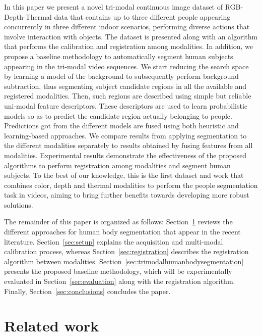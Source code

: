 \documentclass[10pt,twocolumn,letterpaper]{article}
\begin{document}
In this paper we present a novel tri-modal continuous image dataset of RGB-Depth-Thermal data that contains up to three different people appearing concurrently in three different indoor scenarios, performing diverse actions that involve interaction with objects. The dataset is presented along with an algorithm that performs the calibration and registration among modalities. In addition, we propose a baseline methodology to automatically segment human subjects appearing in the tri-modal video sequences. We start reducing the search space by learning a model of the background to subsequently perform background subtraction, thus segmenting subject candidate regions in all the available and registered modalities. Then, such regions are described using simple but reliable uni-modal feature descriptors. These descriptors are used to learn probabilistic models so as to predict the candidate region actually belonging to people. Predictions got from the different models are fused using both heuristic and learning-based approaches. We compare results from applying segmentation to the different modalities separately to results obtained by fusing features from all modalities. Experimental results demonstrate the effectiveness of the proposed algorithms to perform registration among modalities and segment human subjects. To the best of our knowledge, this is the first dataset and work that combines color, depth and thermal modalities to perform the people segmentation task in videos, aiming to bring further benefits towards developing more robust solutions.

The remainder of this paper is organized as follows: Section~\ref{sec:relatedwork} reviews the different approaches for human body segmentation that appear in the recent literature. Section~\ref{sec:setup} explains the acquisition and multi-modal calibration process, whereas Section~\ref{sec:registration} describes the registration algorithm between modalities. Section~\ref{sec:trimodalhumanbodysegmentation} presents the proposed baseline methodology, which will be experimentally evaluated in Section~\ref{sec:evaluation} along with the registration algorithm. Finally, Section~\ref{sec:conclusions} concludes the paper.

\section{Related work}
\label{sec:relatedwork}
 
\end{document}
